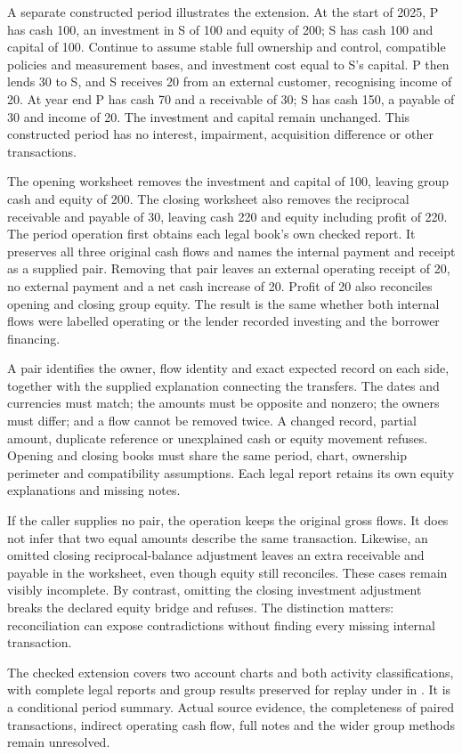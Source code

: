 A separate constructed period illustrates the extension. At the start of
2025, P has cash 100, an investment in S of 100 and equity of 200; S has cash
100 and capital of 100. Continue to assume stable full ownership and control,
compatible policies and measurement bases, and investment cost equal to S's
capital. P then lends 30 to S, and S receives 20 from an external customer,
recognising income of 20. At year end P has cash 70 and a receivable of 30;
S has cash 150, a payable of 30 and income of 20. The investment and capital
remain unchanged. This constructed period has no interest, impairment,
acquisition difference or other transactions.

The opening worksheet removes the investment and capital of 100, leaving
group cash and equity of 200. The closing worksheet also removes the reciprocal
receivable and payable of 30, leaving cash 220 and equity including profit of
220. The period operation first obtains each legal book's own checked report.
It preserves all three original cash flows and names the internal payment and
receipt as a supplied pair. Removing that pair leaves an external operating
receipt of 20, no external payment and a net cash increase of 20. Profit of
20 also reconciles opening and closing group equity. The result is the same
whether both internal flows were labelled operating or the lender recorded
investing and the borrower financing.

A pair identifies the owner, flow identity and exact expected record on each
side, together with the supplied explanation connecting the transfers.
The dates and currencies must match; the amounts must be opposite and nonzero;
the owners must differ; and a flow cannot be removed twice. A changed record,
partial amount, duplicate reference or unexplained cash or equity movement
refuses. Opening and closing books must share the same period, chart,
ownership perimeter and compatibility assumptions. Each legal report retains
its own equity explanations and missing notes.

If the caller supplies no pair, the operation keeps the original gross flows.
It does not infer that two equal amounts describe the same transaction.
Likewise, an omitted closing reciprocal-balance adjustment leaves an extra
receivable and payable in the worksheet, even though equity still reconciles.
These cases remain visibly incomplete. By contrast, omitting the closing
investment adjustment breaks the declared equity bridge and refuses. The
distinction matters: reconciliation can expose contradictions without finding
every missing internal transaction.

The checked extension covers two account charts and both activity
classifications, with complete legal reports and group results preserved for
replay under  in
. It is a conditional period summary.
Actual source evidence, the completeness of paired transactions, indirect
operating cash flow, full notes and the wider group methods remain unresolved.




